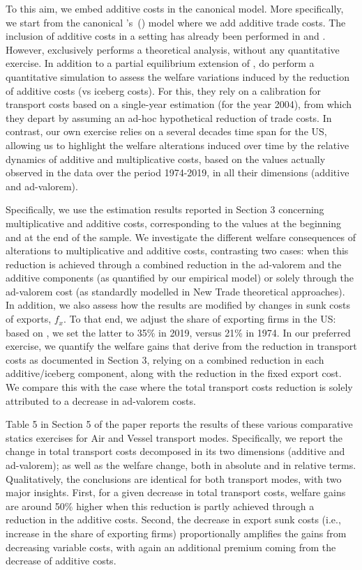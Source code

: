 \documentclass[a4paper,11pt]{article}
\newcommand\cites[1]{\citeauthor{#1}'s\ (\citeyear{#1})}
\begin{document}
To this aim, we embed additive costs in the canonical \citet{melitz} model. More specifically, we start from the canonical \cites{melitz} model where we add additive trade costs. The inclusion of additive costs in a \citet{melitz} setting has already been performed in \citet{sorensen2014} and \citet{Irrazabal_2015}. However, \citet{sorensen2014} exclusively performs a theoretical analysis, without any quantitative exercise. In addition to a partial equilibrium extension of \citet{melitz}, \citet{Irrazabal_2015} do perform a quantitative simulation to assess the welfare variations induced by the reduction of additive costs (vs iceberg costs). For this, they rely on a calibration for transport costs based on a single-year estimation (for the year 2004), from which they depart by assuming an ad-hoc hypothetical reduction of trade costs. In contrast, our own exercise relies on a several decades time span for the US, allowing us to highlight the welfare alterations induced over time by the relative dynamics of additive and multiplicative costs, based on the values actually observed in the data over the period 1974-2019, in all their dimensions (additive and ad-valorem).\smallskip

Specifically, we use the estimation results reported in Section 3 concerning multiplicative and additive costs, corresponding to the values at the beginning and at the end of the sample. We investigate the different welfare consequences of alterations to multiplicative and additive costs, contrasting two cases: when this reduction is achieved through a combined reduction in the ad-valorem and the additive components (as quantified by our empirical model) or solely through the ad-valorem cost (as standardly modelled in New Trade theoretical approaches). In addition, we also assess how the results are modified by changes in sunk costs of exports, $f_{x}$. To that end, we adjust the share of exporting firms in the US: based on \citet{Lincoln_McCallum2018}, we set the latter to 35\% in 2019, versus 21\% in 1974. In our preferred exercise, we quantify the welfare gains that derive from the reduction in transport costs as documented in Section 3, relying on a combined reduction in each additive/iceberg component, along with the reduction in the fixed export cost. We compare this with the case where the total transport costs reduction is solely attributed to a decrease in ad-valorem costs.

Table 5 in Section 5 of the paper reports the results of these various comparative statics exercises for Air and Vessel transport modes. Specifically, we report the change in total transport costs decomposed in its two dimensions (additive and ad-valorem); as well as the welfare change, both in absolute and in relative terms. Qualitatively, the conclusions are identical for both transport modes, with two major insights. First, for a given decrease in total transport costs,  welfare gains are around 50\% higher when this reduction is partly achieved through a reduction in the additive costs. Second, the decrease in export sunk costs (i.e., increase in the share of exporting firms) proportionally amplifies the gains from decreasing variable costs, with again an additional premium coming from the decrease of additive costs.
\end{document}
